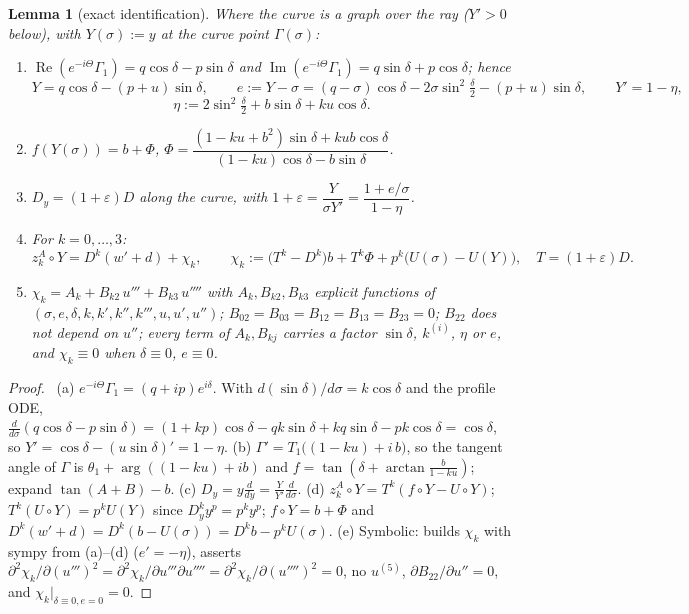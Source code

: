 \documentclass[11pt]{article}
\newtheorem{lemma}{Lemma}
\theoremstyle{remark}\newtheorem{remark}{Remark}
\newcommand{\fn}[1]{\texttt{\detokenize{#1}}}
\begin{document}
\begin{lemma}[exact identification]\label{C:lem:id}
Where the curve is a graph over the ray ($Y'>0$ below), with $Y(\sigma):=y$ at the curve point $\Gamma(\sigma)$:
\begin{enumerate}
\item[(a)] $\operatorname{Re}(e^{-i\Theta}\Gamma_1)=q\cos\delta-p\sin\delta$ and $\operatorname{Im}(e^{-i\Theta}\Gamma_1)=q\sin\delta+p\cos\delta$; hence
\[Y=q\cos\delta-(p+u)\sin\delta,\qquad e:=Y-\sigma=(q-\sigma)\cos\delta-2\sigma\sin^2\tfrac\delta2-(p+u)\sin\delta,\qquad Y'=1-\eta,\]
\[\eta:=2\sin^2\tfrac\delta2+b\sin\delta+ku\cos\delta .\]
\item[(b)] $f(Y(\sigma))=b+\Phi$, \qquad $\Phi=\dfrac{(1-ku+b^2)\sin\delta+kub\cos\delta}{(1-ku)\cos\delta-b\sin\delta}$.
\item[(c)] $D_y=(1+\varepsilon)D$ along the curve, with $1+\varepsilon=\dfrac{Y}{\sigma Y'}=\dfrac{1+e/\sigma}{1-\eta}$.
\item[(d)] For $k=0,\dots,3$:
\[
z^A_k\circ Y=D^k(w'+d)+\chi_k,\qquad \chi_k:=\bigl(T^k-D^k\bigr)b+T^k\Phi+p^k\bigl(U(\sigma)-U(Y)\bigr),\quad T=(1+\varepsilon)D .
\]
\item[(e)] $\chi_k=A_k+B_{k2}\,u'''+B_{k3}\,u''''$ with $A_k,B_{k2},B_{k3}$ explicit functions of $(\sigma,e,\delta,k,k',k'',k''',u,u',u'')$; $B_{02}=B_{03}=B_{12}=B_{13}=B_{23}=0$; $B_{22}$ does not depend on $u''$; every term of $A_k,B_{kj}$ carries a factor $\sin\delta$, $k^{(i)}$, $\eta$ or $e$, and $\chi_k\equiv0$ when $\delta\equiv0$, $e\equiv0$.
\end{enumerate}
\end{lemma}

\begin{proof}\tP\ (a) $e^{-i\Theta}\Gamma_1=(q+ip)e^{i\delta}$. With $d(\sin\delta)/d\sigma=k\cos\delta$ and the profile ODE, $\frac{d}{d\sigma}(q\cos\delta-p\sin\delta)=(1+kp)\cos\delta-qk\sin\delta+kq\sin\delta-pk\cos\delta=\cos\delta$, so $Y'=\cos\delta-(u\sin\delta)'=1-\eta$. (b) $\Gamma'=T_1\bigl((1-ku)+i\,b\bigr)$, so the tangent angle of $\Gamma$ is $\theta_1+\arg((1-ku)+ib)$ and $f=\tan(\delta+\arctan\frac b{1-ku})$; expand $\tan(A+B)-b$. (c) $D_y=y\frac d{dy}=\frac{Y}{Y'}\frac d{d\sigma}$. (d) $z^A_k\circ Y=T^k(f\circ Y-U\circ Y)$; $T^k(U\circ Y)=p^kU(Y)$ since $D_y^ky^p=p^ky^p$; $f\circ Y=b+\Phi$ and $D^k(w'+d)=D^k(b-U(\sigma))=D^kb-p^kU(\sigma)$. (e) Symbolic: \fn{n1_chart.py} builds $\chi_k$ with sympy from (a)--(d) ($e'=-\eta$), asserts $\partial^2\chi_k/\partial(u''')^2=\partial^2\chi_k/\partial u'''\partial u''''=\partial^2\chi_k/\partial(u'''')^2=0$, no $u^{(5)}$, $\partial B_{22}/\partial u''=0$, and $\chi_k|_{\delta\equiv0,e=0}=0$.
\end{proof}
\end{document}
